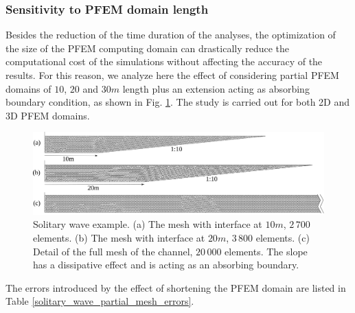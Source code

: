 \subsubsection{Sensitivity to PFEM domain length}
Besides the reduction of the time duration of the analyses, the optimization of the size of the PFEM computing domain can drastically reduce the computational cost of the simulations without affecting the accuracy of the results.
For this reason, we analyze here the effect of considering partial PFEM domains of $10$, $20$ and $30m$ length plus an extension acting as absorbing boundary condition, as shown in  Fig. \ref{solitary_wave_pfem_meshes}. The study is carried out for both 2D and 3D PFEM domains.
\begin{figure} [htb]
    \centering
    \includegraphics[width=\textwidth]{img/coupling/solitary_wave_pfem_meshes.png}
    \caption{Solitary wave example. (a) The mesh with interface at $10m$, $2\,700$ elements. (b) The mesh with interface at $20m$, $3\,800$ elements. (c) Detail of the full mesh of the channel, $20\,000$ elements. The slope has a dissipative effect and is acting as an absorbing boundary.}
    \label{solitary_wave_pfem_meshes}
\end{figure}
The errors introduced by the effect of shortening the PFEM domain are listed in Table \ref{solitary_wave_partial_mesh_errors}.

